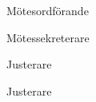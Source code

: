 \documentclass[10pt]{article}
\def\mo{Pontus Landgren}
\def\ms{Mattias Lundström}
\def\ji{Rasmus Sobel}
\def\jii{Filip Larsson}
\begin{document}

%


\hidesignfoot
\begin{signatures}{4}
\signature{\mo}{Mötesordförande}
\signature{\ms}{Mötessekreterare}
\signature{\ji}{Justerare}
\signature{\jii}{Justerare}
\end{signatures}
\end{document}
